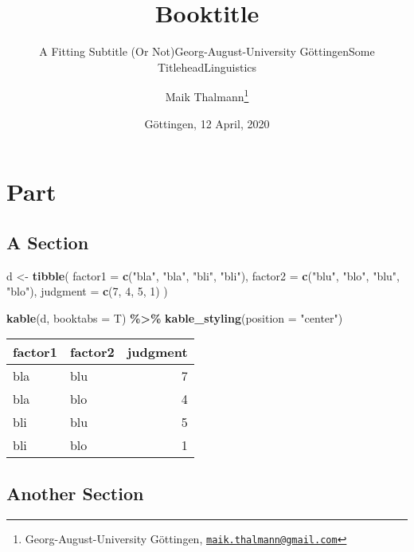 \documentclass[
    numbers=noenddot,
    open=any,
    paper=a4,
    oneside,
    pagesize,
    captions=tableheading,
    bibliography=totoc,
    11pt
    ]{scrbook}
\title{Booktitle}
\subtitle{A Fitting Subtitle (Or Not)}
\subtitle{Georg-August-University Göttingen}
\subtitle{Some Titlehead}
\subtitle{Linguistics}
\author{Maik Thalmann\footnote{Georg-August-University Göttingen,
  \href{mailto:maik.thalmann@gmail.com}{\nolinkurl{maik.thalmann@gmail.com}}}}
\date{Göttingen, 12 April, 2020}
\newenvironment{Shaded}{\begin{snugshade}}{\end{snugshade}}
\newcommand{\DataTypeTok}[1]{\textcolor[rgb]{0.13,0.29,0.53}{#1}}
\newcommand{\DecValTok}[1]{\textcolor[rgb]{0.00,0.00,0.81}{#1}}
\newcommand{\KeywordTok}[1]{\textcolor[rgb]{0.13,0.29,0.53}{\textbf{#1}}}
\newcommand{\NormalTok}[1]{#1}
\newcommand{\OperatorTok}[1]{\textcolor[rgb]{0.81,0.36,0.00}{\textbf{#1}}}
\newcommand{\StringTok}[1]{\textcolor[rgb]{0.31,0.60,0.02}{#1}}
\begin{document}
\maketitle

\tableofcontents
\hypertarget{part}{%
\part{Part}\label{part}}

\hypertarget{a-section}{%
\chapter{A Section}\label{a-section}}

\begin{Shaded}
\begin{Highlighting}[]
\NormalTok{d \textless{}{-}}\StringTok{ }\KeywordTok{tibble}\NormalTok{(}
  \DataTypeTok{factor1 =} \KeywordTok{c}\NormalTok{(}\StringTok{"bla"}\NormalTok{, }\StringTok{"bla"}\NormalTok{, }\StringTok{"bli"}\NormalTok{, }\StringTok{"bli"}\NormalTok{),}
  \DataTypeTok{factor2 =} \KeywordTok{c}\NormalTok{(}\StringTok{"blu"}\NormalTok{, }\StringTok{"blo"}\NormalTok{, }\StringTok{"blu"}\NormalTok{, }\StringTok{"blo"}\NormalTok{),}
  \DataTypeTok{judgment =} \KeywordTok{c}\NormalTok{(}\DecValTok{7}\NormalTok{, }\DecValTok{4}\NormalTok{, }\DecValTok{5}\NormalTok{, }\DecValTok{1}\NormalTok{)}
\NormalTok{)}

\KeywordTok{kable}\NormalTok{(d, }\DataTypeTok{booktabs =}\NormalTok{ T) }\OperatorTok{\%\textgreater{}\%}
\StringTok{  }\KeywordTok{kable\_styling}\NormalTok{(}\DataTypeTok{position =} \StringTok{"center"}\NormalTok{)}
\end{Highlighting}
\end{Shaded}

\begin{table}[H]
\centering
\begin{tabular}{llr}
\toprule
factor1 & factor2 & judgment\\
\midrule
bla & blu & 7\\
bla & blo & 4\\
bli & blu & 5\\
bli & blo & 1\\
\bottomrule
\end{tabular}
\end{table}

\hypertarget{another-section}{%
\chapter{Another Section}\label{another-section}}
\end{document}
